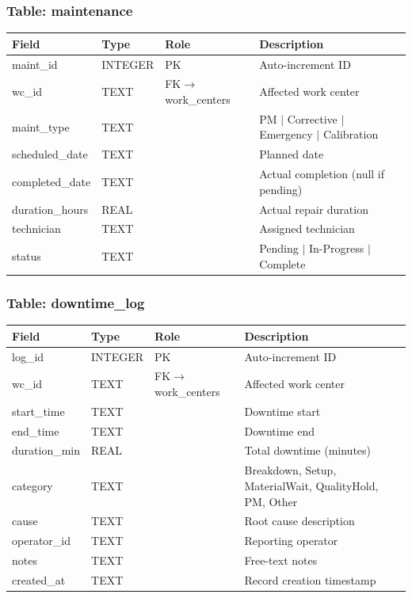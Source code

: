 \documentclass[11pt]{article}
\begin{document}
\subsubsection*{Table: maintenance}
\begin{table}[H]\centering\small
\begin{tabular}{@{} l l l L{5.0cm} @{}}
\toprule
\textbf{Field} & \textbf{Type} & \textbf{Role} & \textbf{Description} \\
\midrule
maint\_id       & INTEGER & PK  & Auto-increment ID \\
wc\_id          & TEXT    & FK$\to$work\_centers & Affected work center \\
maint\_type     & TEXT    &     & PM $\mid$ Corrective $\mid$ Emergency $\mid$ Calibration \\
scheduled\_date & TEXT    &     & Planned date \\
completed\_date & TEXT    &     & Actual completion (null if pending) \\
duration\_hours & REAL    &     & Actual repair duration \\
technician      & TEXT    &     & Assigned technician \\
status          & TEXT    &     & Pending $\mid$ In-Progress $\mid$ Complete \\
\bottomrule
\end{tabular}
\end{table}

\subsubsection*{Table: downtime\_log}
\begin{table}[H]\centering\small
\begin{tabular}{@{} l l l L{5.0cm} @{}}
\toprule
\textbf{Field} & \textbf{Type} & \textbf{Role} & \textbf{Description} \\
\midrule
log\_id       & INTEGER & PK  & Auto-increment ID \\
wc\_id        & TEXT    & FK$\to$work\_centers & Affected work center \\
start\_time   & TEXT    &     & Downtime start \\
end\_time     & TEXT    &     & Downtime end \\
duration\_min & REAL    &     & Total downtime (minutes) \\
category      & TEXT    &     & Breakdown, Setup, MaterialWait, QualityHold, PM, Other \\
cause         & TEXT    &     & Root cause description \\
operator\_id  & TEXT    &     & Reporting operator \\
notes         & TEXT    &     & Free-text notes \\
created\_at   & TEXT    &     & Record creation timestamp \\
\bottomrule
\end{tabular}
\end{table}
\end{document}
